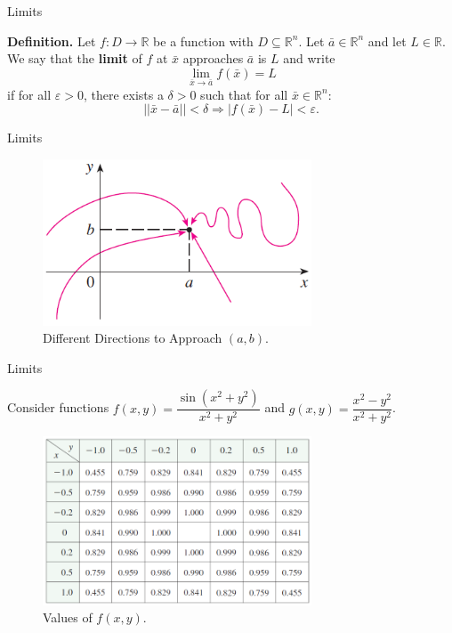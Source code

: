 \documentclass{beamer}
\begin{document}
    \begin{frame}[t]{Limits}
        \begin{block}
            \par \textbf{Definition.} Let $f: D \to \mathbb{R}$ be a function with $D \subseteq \mathbb{R}^n$. Let $\bar{a} \in \mathbb{R}^n$ and let $L \in \mathbb{R}$. We say that the \textbf{limit} of $f$ at $\bar{x}$ approaches $\bar{a}$ is $L$ and write 
            \begin{equation*}
                \lim\limits_{\bar{x} \to \bar{a}} f(\bar{x}) = L
            \end{equation*}
            if for all $\varepsilon > 0$, there exists a $\delta > 0$ such that for all $\bar{x} \in \mathbb{R}^n$: $$||\bar{x} - \bar{a}|| < \delta \Rightarrow |f(\bar{x}) - L| < \varepsilon .$$
        \end{block}
    \end{frame}

    \begin{frame}[t]{Limits}
        \begin{figure}
            \centering 
            \includegraphics[width = 8cm]{f8}
            \caption{Different Directions to Approach $(a,b)$.}
        \end{figure}
    \end{frame}

    \begin{frame}[t]{Limits}
        \par Consider functions $f(x,y) = \dfrac{\sin(x^2+y^2)}{x^2+y^2}$ and $g(x,y) = \dfrac{x^2-y^2}{x^2+y^2}$.
        \begin{figure}
            \centering 
            \includegraphics[width = 8cm]{f5}
            \caption{Values of $f(x,y)$.}
        \end{figure}
    \end{frame}
\end{document}
